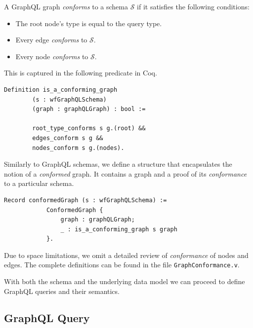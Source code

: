 \begin{definition}
A GraphQL graph \textit{conforms} to a schema $\mathcal{S}$ if it satisfies the following conditions:
\begin{itemize}
    \item The root node's type is equal to the query type.
    \item Every edge \textit{conforms} to $\mathcal{S}$.
    \item Every node \textit{conforms} to $\mathcal{S}$.
\end{itemize}
\end{definition}

This is captured in the following predicate in Coq.
\begin{verbatim}
Definition is_a_conforming_graph
        (s : wfGraphQLSchema)
        (graph : graphQLGraph) : bool :=

        root_type_conforms s g.(root) &&
        edges_conform s g &&
        nodes_conform s g.(nodes).
\end{verbatim}

Similarly to GraphQL schemas, we define a structure that encapsulates the notion of a \textit{conformed} graph. It contains a graph and a proof of its \textit{conformance} to a particular schema.

\begin{verbatim}
Record conformedGraph (s : wfGraphQLSchema) :=
            ConformedGraph {
                graph : graphQLGraph;
                _ : is_a_conforming_graph s graph
            }.
\end{verbatim}

Due to space limitations, we omit a detailed review of \textit{conformance} of nodes and edges. The complete definitions can be found in the file \texttt{GraphConformance.v}. %

With both the schema and the underlying data model we can proceed to define GraphQL queries and their semantics.

\subsection{GraphQL Query}

